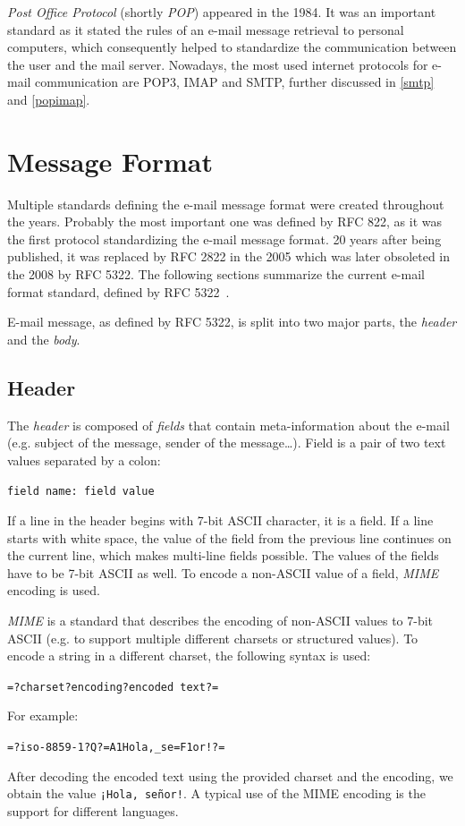\emph{Post Office Protocol} (shortly \emph{POP}) appeared in the 1984. It was an important standard as it stated the rules of an e-mail message retrieval to personal computers, which consequently helped to standardize the communication between the user and the mail server. Nowadays, the most used internet protocols for e-mail communication are POP3, IMAP and SMTP, further discussed in \autoref{smtp} and \autoref{popimap}.

\section{Message Format}
Multiple standards defining the e-mail message format were created throughout the years. Probably the most important one was defined by RFC 822, as it was the first protocol standardizing the e-mail message format. 20 years after being published, it was replaced by RFC 2822 in the 2005 which was later obsoleted in the 2008 by RFC 5322.
The following sections summarize the current e-mail format standard, defined by RFC 5322~\cite{rfc5322}.

E-mail message, as defined by RFC 5322, is split into two major parts, the \emph{header} and the \emph{body}.

\subsection{Header}
The \emph{header} is composed of \emph{fields} that contain meta-information about the e-mail (e.g. subject of the message, sender of the message\dots).
Field is a pair of two text values separated by a colon:
\begin{center}
\texttt{field name: field value}
\end{center}
If a line in the header begins with 7-bit ASCII character, it is a field. If a line starts with white space, the value of the field from the previous line continues on the current line, which makes multi-line fields possible. The values of the fields have to be 7-bit ASCII as well. To encode a non-ASCII value of a field, \emph{MIME} encoding is used. 

\label{mime}
\emph{MIME} is a standard that describes the encoding of non-ASCII values to 7-bit ASCII (e.g. to support multiple different charsets or structured values). To encode a string in a different charset, the following syntax is used:
\begin{center}
\texttt{=?charset?encoding?encoded text?=}
\end{center}
For example:
\begin{center}
\texttt{=?iso-8859-1?Q?=A1Hola,\_se=F1or!?=}
\end{center}
After decoding the encoded text using the provided charset and the encoding, we obtain the value \texttt{¡Hola, señor!}. A typical use of the MIME encoding is the support for different languages.

